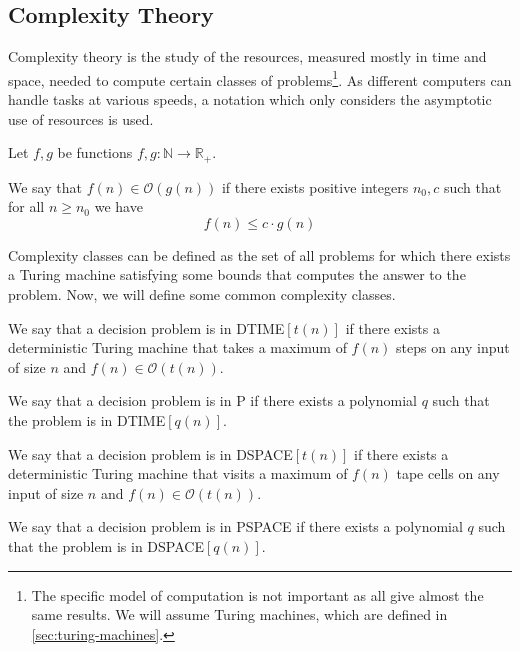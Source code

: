 \subsection{Complexity Theory}\label{subsec:complexity-theory}

Complexity theory is the study of the resources, measured mostly in time and space, needed to compute certain classes of problems\footnote{The specific model of computation is not important as all give almost the same results. We will assume Turing machines, which are defined in \cref{sec:turing-machines}.}.
As different computers can handle tasks at various speeds, a notation which only considers the asymptotic use of resources is used.

\begin{define}
    Let $f, g$ be functions $f, g: \mathbb{N} \to \mathbb{R}_+$.

    We say that $f(n) \in \mathcal{O}(g(n))$ if there exists positive integers $n_0, c$ such that for all $n \geq n_0$ we have \[f(n) \leq c\cdot g(n)\]
\end{define}

Complexity classes can be defined as the set of all problems for which there exists a Turing machine satisfying some bounds that computes the answer to the problem.
Now, we will define some common complexity classes.

\begin{define}
[{DTIME$[t(n)]$}]
    We say that a decision problem is in DTIME$[t(n)]$ if there exists a deterministic Turing machine that takes a maximum of $f(n)$ steps on any input of size $n$ and $f(n) \in \mathcal{O}(t(n))$.
\end{define}

\begin{define}[P]
    We say that a decision problem is in P if there exists a polynomial $q$ such that the problem is in DTIME$[q(n)]$.
\end{define}

\begin{define}
[{DSPACE$[t(n)]$}]
    We say that a decision problem is in DSPACE$[t(n)]$ if there exists a deterministic Turing machine that visits a maximum of $f(n)$ tape cells on any input of size $n$ and $f(n) \in \mathcal{O}(t(n))$.
\end{define}

\begin{define}[PSPACE]
    We say that a decision problem is in PSPACE if there exists a polynomial $q$ such that the problem is in DSPACE$[q(n)]$.
\end{define}

